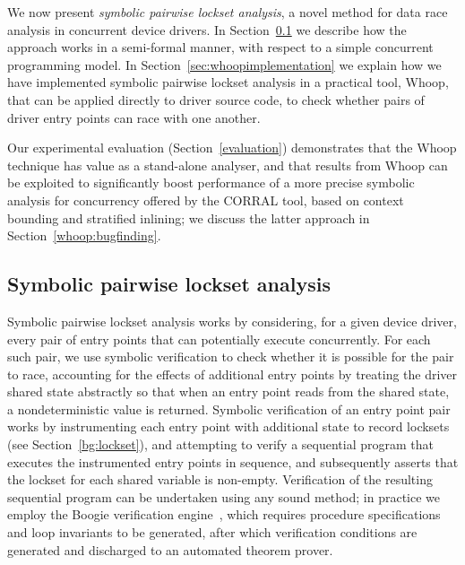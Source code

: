 
We now present \emph{symbolic pairwise lockset analysis}, a novel method
for data race analysis in concurrent device drivers.  In
Section~\ref{sec:symbolicpairwise} we describe how the approach works
in a semi-formal manner, with respect to a simple concurrent
programming model.  In Section~\ref{sec:whoopimplementation} we
explain how we have implemented symbolic pairwise lockset analysis in
a practical tool, Whoop, that can be applied directly to driver source
code, to check whether pairs of driver entry points can race with one
another.

Our experimental evaluation (Section~\ref{evaluation}) demonstrates that the Whoop technique has value as a stand-alone analyser, and that results from Whoop can be exploited to significantly boost performance of a more precise symbolic analysis for concurrency offered by the CORRAL tool, based on context bounding and stratified inlining; we discuss the latter approach in Section~\ref{whoop:bugfinding}.

\subsection{Symbolic pairwise lockset analysis}\label{sec:symbolicpairwise}


Symbolic pairwise lockset analysis works by considering, for a given device driver, every pair of entry points that can potentially execute concurrently.  For each such pair, we use symbolic verification to check whether it is possible for the pair to race, accounting for the effects of additional entry points by treating the driver shared state abstractly so that when an entry point reads from the shared state, a nondeterministic value is returned.  Symbolic verification of an entry point pair works by instrumenting each entry point with additional state to record locksets (see Section~\ref{bg:lockset}), and attempting to verify a sequential program that executes the instrumented entry points in sequence, and subsequently asserts that the lockset for each shared variable is non-empty.  Verification of the resulting sequential program can be undertaken using any sound method; in practice we employ the Boogie verification engine~\cite{barnett2006boogie}, which requires procedure specifications and loop invariants to be generated, after which verification conditions are generated and discharged to an automated theorem prover.

